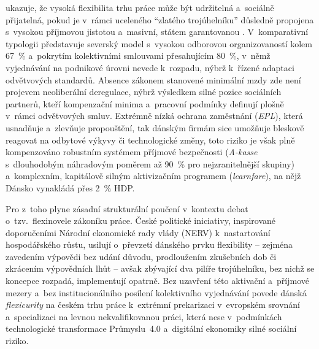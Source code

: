 ukazuje, že vysoká flexibilita trhu práce může být udržitelná a~sociálně přijatelná, pokud je v~rámci uceleného \enquote{zlatého trojúhelníku} důsledně propojena s~vysokou příjmovou jistotou a~masivní, státem garantovanou . V~komparativní typologii představuje severský model s~vysokou odborovou organizovaností kolem \SI{67}{\percent} a~pokrytím kolektivními smlouvami přesahujícím \SI{80}{\percent}, v~němž vyjednávání na podnikové úrovni nevede k~rozpadu, nýbrž k~řízené adaptaci odvětvových standardů. Absence zákonem stanovené minimální mzdy zde není projevem neoliberální deregulace, nýbrž výsledkem silné pozice sociálních partnerů, kteří kompenzační minima a~pracovní podmínky definují plošně v~rámci odvětvových smluv. Extrémně nízká ochrana zaměstnání (\textit{EPL}), která usnadňuje a~zlevňuje propouštění, tak dánským firmám sice umožňuje bleskově reagovat na odbytové výkyvy či technologické změny, toto riziko je však plně kompenzováno robustním systémem příjmové bezpečnosti (\textit{A-kasse} s~dlouhodobým náhradovým poměrem až \SI{90}{\percent} pro nejzranitelnější skupiny) a~komplexním, kapitálově silným aktivizačním programem (\textit{learnfare}), na nějž Dánsko vynakládá přes \SI{2}{\percent} \acs{HDP}.~\cite{JdeToPruzne_PS1_FlexicurityDK_2019}~\cite{Denmark_LabourMarket}\par

Pro  z~toho plyne zásadní strukturální poučení v~kontextu debat o~tzv.~flexinovele zákoníku práce. České politické iniciativy, inspirované doporučeními Národní ekonomické rady vlády (\acs{NERV}) k~nastartování hospodářského růstu, usilují o~převzetí dánského prvku flexibility -- zejména zavedením výpovědi bez udání důvodu, prodloužením zkušebních dob či zkrácením výpovědních lhůt -- avšak zbývající dva pilíře trojúhelníku, bez nichž se koncepce rozpadá, implementují opatrně. Bez uzavření této aktivační a~příjmové mezery a~bez institucionálního posílení kolektivního vyjednávání povede dánská \textit{flexicurity} na českém trhu práce k~extrémní prekarizaci v~evropském srovnání a~specializaci na levnou nekvalifikovanou práci, která nese v~podmínkách technologické transformace Průmyslu~4.0 a~digitální ekonomiky silné sociální riziko.~\cite{NERV_NavrhyRustu2025}\par
